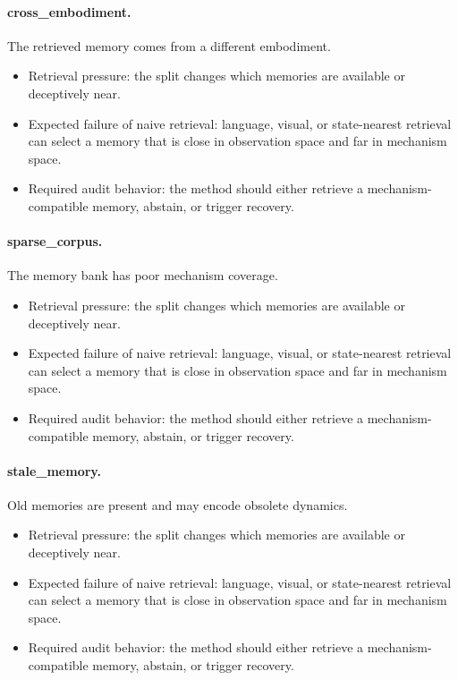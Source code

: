 \documentclass{article}
\begin{document}
\paragraph{cross\_embodiment.} The retrieved memory comes from a different embodiment.
\begin{itemize}
\item Retrieval pressure: the split changes which memories are available or deceptively near.
\item Expected failure of naive retrieval: language, visual, or state-nearest retrieval can select a memory that is close in observation space and far in mechanism space.
\item Required audit behavior: the method should either retrieve a mechanism-compatible memory, abstain, or trigger recovery.
\end{itemize}
\paragraph{sparse\_corpus.} The memory bank has poor mechanism coverage.
\begin{itemize}
\item Retrieval pressure: the split changes which memories are available or deceptively near.
\item Expected failure of naive retrieval: language, visual, or state-nearest retrieval can select a memory that is close in observation space and far in mechanism space.
\item Required audit behavior: the method should either retrieve a mechanism-compatible memory, abstain, or trigger recovery.
\end{itemize}
\paragraph{stale\_memory.} Old memories are present and may encode obsolete dynamics.
\begin{itemize}
\item Retrieval pressure: the split changes which memories are available or deceptively near.
\item Expected failure of naive retrieval: language, visual, or state-nearest retrieval can select a memory that is close in observation space and far in mechanism space.
\item Required audit behavior: the method should either retrieve a mechanism-compatible memory, abstain, or trigger recovery.
\end{itemize}
\end{document}
